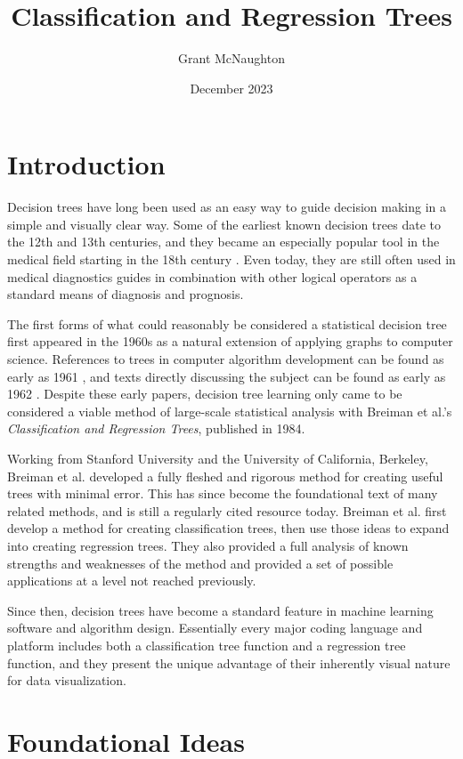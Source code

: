 \documentclass[12pt,english,letterpaper]{article}
\title{Classification and Regression Trees}
\author{Grant McNaughton}
\date{December 2023}
\begin{document}
 
\maketitle

\section{Introduction}

Decision trees have long been used as an easy way to guide decision making in a simple and visually clear way. Some of the earliest known decision trees date to the 12th and 13th centuries, and they became an especially popular tool in the medical field starting in the 18th century \cite{lima}. Even today, they are still often used in medical diagnostics guides in combination with other logical operators as a standard means of diagnosis and prognosis.

The first forms of what could reasonably be considered a statistical decision tree first appeared in the 1960s as a natural extension of applying graphs to computer science. References to trees in computer algorithm development can be found as early as 1961 \cite{feigenbaum}, and texts directly discussing the subject can be found as early as 1962 \cite{quinlan}. Despite these early papers, decision tree learning only came to be considered a viable method of large-scale statistical analysis with Breiman et al.’s \textit{Classification and Regression Trees}, published in 1984.\cite{breiman}

Working from Stanford University and the University of California, Berkeley, Breiman et al. developed a fully fleshed and rigorous method for creating useful trees with minimal error. This has since become the foundational text of many related methods, and is still a regularly cited resource today. Breiman et al. first develop a method for creating classification trees, then use those ideas to expand into creating regression trees. They also provided a full analysis of known strengths and weaknesses of the method and provided a set of possible applications at a level not reached previously.

Since then, decision trees have become a standard feature in machine learning software and algorithm design. Essentially every major coding language and platform includes both a classification tree function and a regression tree function, and they present the unique advantage of their inherently visual nature for data visualization.

\section{Foundational Ideas}
\end{document}
